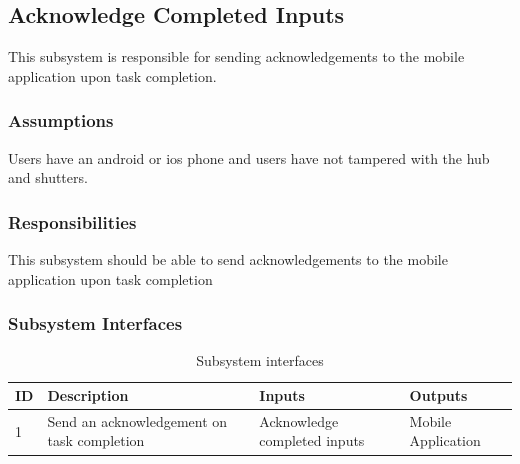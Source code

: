 \subsection{Acknowledge Completed Inputs}
This subsystem is responsible for sending acknowledgements to the mobile application upon task completion.

\subsubsection{Assumptions}
Users have an android or ios phone and users have not tampered with the hub and shutters.

\subsubsection{Responsibilities}
This subsystem should be able to send acknowledgements to the mobile application upon task completion

\subsubsection{Subsystem Interfaces}

\begin {table}[H]
\caption {Subsystem interfaces} 
\begin{center}
    \begin{tabular}{ | p{1cm} | p{7cm} | p{5cm} | p{5cm} |}
    \hline
    ID & Description & Inputs & Outputs \\ \hline
    1 & Send an acknowledgement on task completion & Acknowledge completed inputs & Mobile Application\\ \hline
    \end{tabular}
\end{center}
\end{table}
